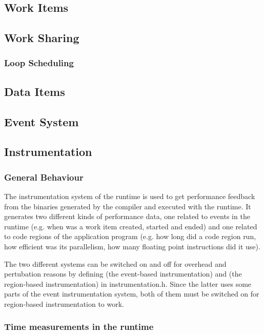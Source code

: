 \subsection{Work Items}
\subsection{Work Sharing}
\subsubsection{Loop Scheduling}
\subsection{Data Items}
\subsection{Event System}

\subsection{Instrumentation}
\label{sec:runtime.instrumentation}

\subsubsection{General Behaviour}
\label{sec:runtime.instrumentation.general.behaviour}

The instrumentation system of the runtime is used to get performance feedback
from the binaries generated by the compiler and executed with the runtime. It
generates two different kinds of performance data, one related to events in the
runtime (e.g. when was a work item created, started and ended) and one related
to code regions of the application program (e.g. how long did a code region run,
how efficient was its parallelism, how many floating point instructions did it
use).

The two different systems can be switched on and off for overhead and
pertubation reasons by defining  (the
event-based instrumentation) and 
(the region-based instrumentation) in instrumentation.h. Since the latter uses
some parts of the event instrumentation system, both of them must be switched on
for region-based instrumentation to work.

\subsubsection{Time measurements in the runtime}

